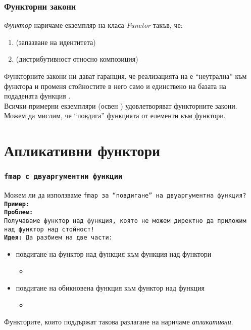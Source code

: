\documentclass[alsotrans]{beamerswitch}
\begin{document}
\begin{frame}
  \frametitle{Функторни закони}
  \begin{definition}
    \emph{Функтор} наричаме екземпляр на класа \emph{Functor} такъв, че:
    \begin{enumerate}
    \item {} \eqv {} (запазване на идентитета)
    \item {}  (дистрибутивност относно композиция)
    \end{enumerate}
  \end{definition}
  \pause
  Функторните закони ни дават гаранция, че реализацията на  е ``неутрална'' към функтора и променя стойностите в него само и единствено на базата на подадената функция .\\
  \pause
  Всички примерни екземпляри (освен ) удовлетворяват функторните закони.\\
  \pause
  Можем да мислим, че  ``повдига'' функцията  от елементи към функтори.
\end{frame}

\section{Апликативни функтори}

\begin{frame}
  \frametitle{\tt{fmap} с двуаргументни функции}
  Можем ли да използваме \tt{fmap} за ``повдигане'' на двуаргументна функция?\\
  \pause
  \onslide<+->
  \textbf{Пример:} \\
  \onslide<+->
  \textbf{Проблем:} \\
  \onslide<+->
  Получаваме функтор над функция, която не можем директно да приложим над функтор над стойност!\\
  \onslide<+->
  \textbf{Идея:} Да разбием  на две части:
  \begin{itemize}[<+->]
  \item повдигане на функтор над функция към функция над функтори
    \begin{itemize}
    \item {}
    \end{itemize}
  \item повдигане на обикновена функция към функтор над функция
    \begin{itemize}
    \item {} 
    \end{itemize}
  \end{itemize}
  \onslide<+->
  Функторите, които поддържат такова разлагане на  наричаме \emph{апликативни}.
\end{frame}
\end{document}
